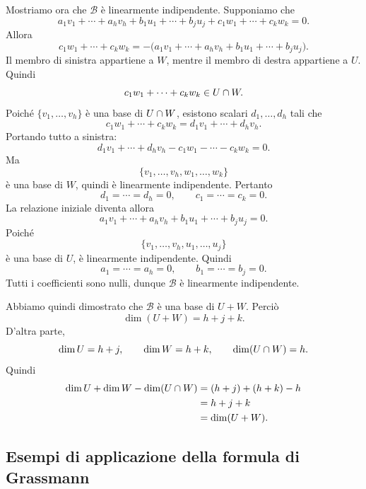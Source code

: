 \documentclass[a4paper]{article}
\begin{document}
\begin{snippetproof}{}
    Mostriamo ora che \(\mathcal{B}\) è linearmente indipendente. Supponiamo che
    \[
        a_1v_1+\cdots+a_hv_h
        +b_1u_1+\cdots+b_ju_j
        +c_1w_1+\cdots+c_kw_k
        =0.
    \]
    Allora
    \[
        c_1w_1+\cdots+c_kw_k
        =
        -\bigl(a_1v_1+\cdots+a_hv_h+b_1u_1+\cdots+b_ju_j\bigr).
    \]
    Il membro di sinistra appartiene a \(W\), mentre il membro di destra appartiene a \(U\). Quindi
    \[
        c_1w_1+\cdots+c_kw_k\in U\cap W.
    \]
    Poiché \(\{v_1,\ldots,v_h\}\) è una base di \(U\cap W\), esistono scalari \(d_1,\ldots,d_h\) tali che
    \[
        c_1w_1+\cdots+c_kw_k=d_1v_1+\cdots+d_hv_h.
    \]
    Portando tutto a sinistra:
    \[
        d_1v_1+\cdots+d_hv_h-c_1w_1-\cdots-c_kw_k=0.
    \]
    Ma
    \[
        \{v_1,\ldots,v_h,w_1,\ldots,w_k\}
    \]
    è una base di \(W\), quindi è linearmente indipendente. Pertanto
    \[
        d_1=\cdots=d_h=0,
        \qquad
        c_1=\cdots=c_k=0.
    \]
    La relazione iniziale diventa allora
    \[
        a_1v_1+\cdots+a_hv_h+b_1u_1+\cdots+b_ju_j=0.
    \]
    Poiché
    \[
        \{v_1,\ldots,v_h,u_1,\ldots,u_j\}
    \]
    è una base di \(U\), è linearmente indipendente. Quindi
    \[
        a_1=\cdots=a_h=0,
        \qquad
        b_1=\cdots=b_j=0.
    \]
    Tutti i coefficienti sono nulli, dunque \(\mathcal{B}\) è linearmente indipendente.

    Abbiamo quindi dimostrato che \(\mathcal{B}\) è una base di \(U+W\). Perciò
    \[
        \dim(U+W)=h+j+k.
    \]
    D'altra parte,
    \[
        \dim U=h+j,
        \qquad
        \dim W=h+k,
        \qquad
        \dim(U\cap W)=h.
    \]
    Quindi
    \begin{align*}
        \dim U+\dim W-\dim(U\cap W)
        &=(h+j)+(h+k)-h\\
        &=h+j+k\\
        &=\dim(U+W).
    \end{align*}
\end{snippetproof}

\subsection{Esempi di applicazione della formula di Grassmann}
\end{document}
